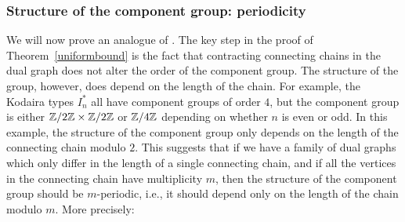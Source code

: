 \subsubsection{Structure of the component group: periodicity}
We will now prove an analogue of \cite[Corollary~4.7]{bano}. The key step in the proof of Theorem~\ref{uniformbound} is the fact that contracting connecting chains in the dual graph does not alter the order of the component group. The structure of the group, however, does depend on the length of the chain. For example, the Kodaira types $I_n^*$ all have component groups of order $4$, but the component group is either $\mathbb Z/2\mathbb Z \times \mathbb Z/2\mathbb Z$  or $\mathbb Z/4\mathbb Z$ depending on whether $n$ is even or odd. In this example, the structure of the component group only depends on the length of the connecting chain modulo $2$. This suggests that if we have a family of dual graphs which only differ in the length of a single connecting chain, and if all the vertices in the connecting chain have multiplicity $m$, then the structure of the component group should be $m$-periodic, i.e., it should depend only on the length of the chain modulo $m$. More precisely:

